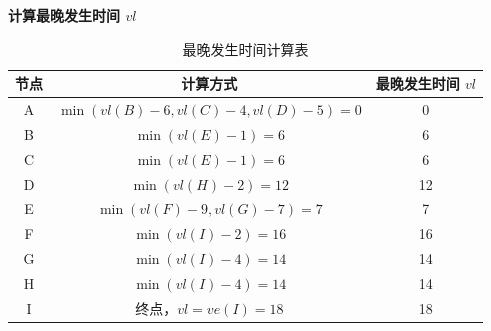 \documentclass[lang=cn,newtx,10pt,scheme=chinese]{../elegantbook}
\begin{document}
\textbf{计算最晚发生时间 $vl$}
\begin{table}[h]
    \centering
    \begin{tabular}{c|c|c}
        \toprule
        \textbf{节点} & \textbf{计算方式} & \textbf{最晚发生时间 $vl$} \\
        \midrule
        A & $\min(vl(B) - 6, vl(C) - 4, vl(D) - 5) = 0$ & 0 \\
        B & $\min(vl(E) - 1) = 6$ & 6 \\
        C & $\min(vl(E) - 1) = 6$ & 6 \\
        D & $\min(vl(H) - 2) = 12$ & 12 \\
        E & $\min(vl(F) - 9, vl(G) - 7) = 7$ & 7 \\
        F & $\min(vl(I) - 2) = 16$ & 16 \\
        G & $\min(vl(I) - 4) = 14$ & 14 \\
        H & $\min(vl(I) - 4) = 14$ & 14 \\
        I & 终点，$vl = ve(I) = 18$ & 18 \\
        \bottomrule
    \end{tabular}
    \caption{最晚发生时间计算表}
\end{table}
\end{document}
